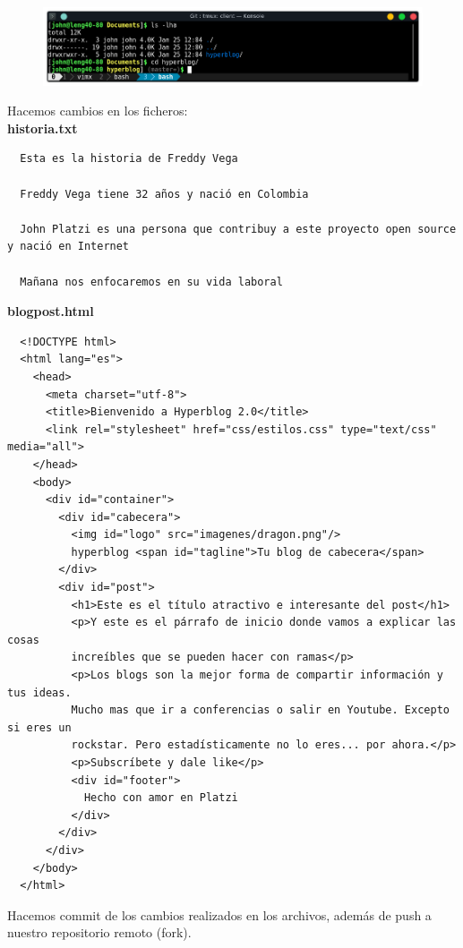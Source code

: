 \documentclass{article}
\begin{document}
\newpage

\begin{figure}[h!]
  \centering
  \includegraphics[scale=0.75]{./Pictures/311_cd_hyperblog.png}
\end{figure}

Hacemos cambios en los ficheros:\\

\textbf{historia.txt}
\begin{verbatim}
  Esta es la historia de Freddy Vega

  Freddy Vega tiene 32 años y nació en Colombia

  John Platzi es una persona que contribuy a este proyecto open source y nació en Internet

  Mañana nos enfocaremos en su vida laboral
\end{verbatim}


\textbf{blogpost.html}
\begin{verbatim}
  <!DOCTYPE html>
  <html lang="es">
    <head>
      <meta charset="utf-8">
      <title>Bienvenido a Hyperblog 2.0</title>
      <link rel="stylesheet" href="css/estilos.css" type="text/css" media="all">
    </head>
    <body>
      <div id="container">
        <div id="cabecera">
          <img id="logo" src="imagenes/dragon.png"/>
          hyperblog <span id="tagline">Tu blog de cabecera</span>
        </div>
        <div id="post">
          <h1>Este es el título atractivo e interesante del post</h1>
          <p>Y este es el párrafo de inicio donde vamos a explicar las cosas
          increíbles que se pueden hacer con ramas</p>
          <p>Los blogs son la mejor forma de compartir información y tus ideas.
          Mucho mas que ir a conferencias o salir en Youtube. Excepto si eres un
          rockstar. Pero estadísticamente no lo eres... por ahora.</p>
          <p>Subscríbete y dale like</p>
          <div id="footer">
            Hecho con amor en Platzi
          </div>
        </div>
      </div>
    </body>
  </html>
\end{verbatim}

\newpage

Hacemos commit de los cambios realizados en los archivos, además de push a
nuestro repositorio remoto (fork).
\end{document}
